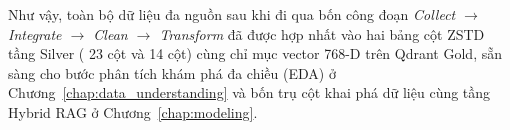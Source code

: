 




Như vậy, toàn bộ dữ liệu đa nguồn sau khi đi qua bốn công đoạn \textit{Collect $\rightarrow$ Integrate $\rightarrow$ Clean $\rightarrow$ Transform} đã được hợp nhất vào hai bảng cột ZSTD tầng Silver ( 23 cột và  14 cột) cùng chỉ mục vector 768-D trên Qdrant Gold, sẵn sàng cho bước phân tích khám phá đa chiều (EDA) ở Chương~\ref{chap:data_understanding} và bốn trụ cột khai phá dữ liệu cùng tầng Hybrid RAG ở Chương~\ref{chap:modeling}.
